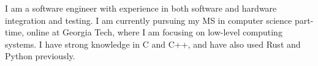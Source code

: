 \documentclass[letter,10pt]{article}
\begin{document}
I am a software engineer with experience in both software and hardware integration and testing. I am currently pursuing my MS in computer science part-time, online at Georgia Tech, where I am focusing on low-level computing systems. I have strong knowledge in C and C++, and have also used Rust and Python previously.
\end{document}

